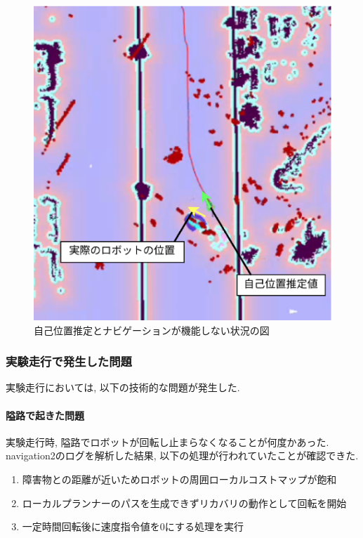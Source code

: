 \begin{figure}[h]
  \begin{center}
    \includegraphics[width=1.0\linewidth]{figs/kinako_result.eps}
    \caption{自己位置推定とナビゲーションが機能しない状況の図}
    \label{fig:kinako_result}
  \end{center}
\end{figure}



\subsubsection{実験走行で発生した問題}
実験走行においては, 以下の技術的な問題が発生した. 

\paragraph{隘路で起きた問題}
実験走行時, 隘路でロボットが回転し止まらなくなることが何度かあった. 
navigation2のログを解析した結果, 以下の処理が行われていたことが確認できた. 

\begin{enumerate}
  \item 障害物との距離が近いためロボットの周囲ローカルコストマップが飽和
  \item ローカルプランナーのパスを生成できずリカバリの動作として回転を開始
  \item  一定時間回転後に速度指令値を0にする処理を実行
\end{enumerate}

